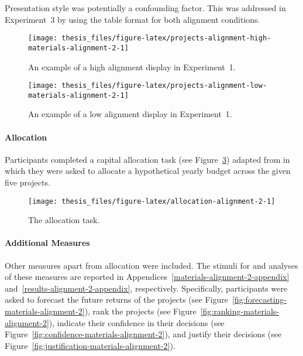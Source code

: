 \documentclass[a4paper, nobind]{templates/ociamthesis}
\theoremstyle{definition}
\theoremstyle{definition}
\theoremstyle{definition}
\theoremstyle{definition}
\theoremstyle{remark}
\begin{document}
Presentation style was potentially a confounding factor. This was addressed in
Experiment~3 by using the table format for both alignment conditions.



\begin{figure}
\texttt{[image: thesis\_files/figure-latex/projects-alignment-high-materials-alignment-2-1]} \caption{An example of a high alignment display in Experiment~1.}\label{fig:projects-alignment-high-materials-alignment-2}
\end{figure}



\begin{figure}
\texttt{[image: thesis\_files/figure-latex/projects-alignment-low-materials-alignment-2-1]} \caption{An example of a low alignment display in Experiment~1.}\label{fig:projects-alignment-low-materials-alignment-2}
\end{figure}

\paragraph{Allocation}

Participants completed a capital allocation task (see
Figure~\ref{fig:allocation-alignment-2}) adapted from \textcite{bardolet2011} in which
they were asked to allocate a hypothetical yearly budget across the given five
projects.



\begin{figure}
\texttt{[image: thesis\_files/figure-latex/allocation-alignment-2-1]} \caption{The allocation task.}\label{fig:allocation-alignment-2}
\end{figure}

\paragraph{Additional Measures}

Other measures apart from allocation were included. The stimuli for and analyses
of these measures are reported in
Appendices~\ref{materials-alignment-2-appendix}
and~\ref{results-alignment-2-appendix}, respectively. Specifically,
participants were asked to forecast the future returns of the projects (see
Figure~\ref{fig:forecasting-materials-alignment-2}), rank the projects (see
Figure~\ref{fig:ranking-materials-alignment-2}), indicate their confidence in
their decisions (see Figure~\ref{fig:confidence-materials-alignment-2}), and
justify their decisions (see
Figure~\ref{fig:justification-materials-alignment-2}).
\end{document}
